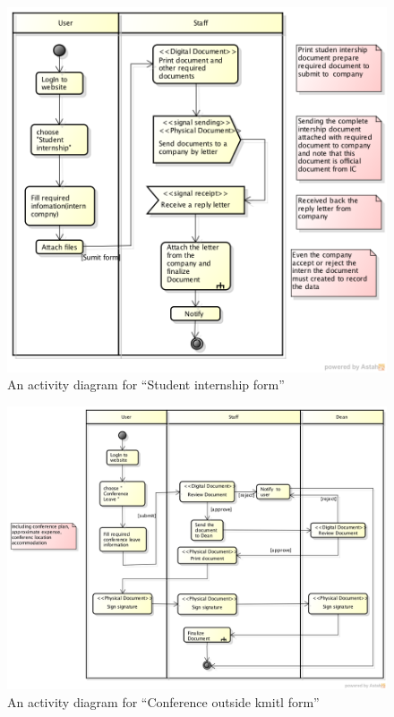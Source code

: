 \begin{figure}
	\centering
	\caption{An activity diagram for \enquote{Student internship form}}
	\label{fig:diagram-student-internship}
	\includegraphics[scale=0.7]{res/requirement/student_internship}
\end{figure}

\begin{figure}
	\centering
	\caption{An activity diagram for \enquote{Conference outside \gls{kmitl} form}}
	\label{fig:diagram-conference}
	\includegraphics[scale=0.45]{res/requirement/conference}
\end{figure}

